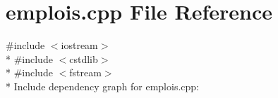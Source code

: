 \section{emplois.\+cpp File Reference}
\label{emplois_8cpp}
{\ttfamily \#include $<$iostream$>$}\\*
{\ttfamily \#include $<$cstdlib$>$}\\*
{\ttfamily \#include $<$fstream$>$}\\*
Include dependency graph for emplois.\+cpp\+:
